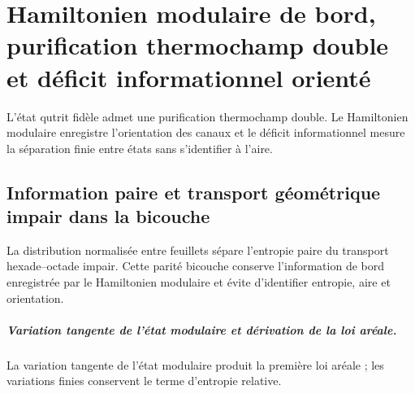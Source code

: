 \chapter{Hamiltonien modulaire de bord, purification thermochamp double et déficit informationnel orienté}
\label{chap:parte-iv-60}

L’état qutrit fidèle admet une purification thermochamp double. Le Hamiltonien modulaire enregistre l’orientation des canaux et le déficit informationnel mesure la séparation finie entre états sans s’identifier à l’aire.



\section{Information paire et transport géométrique impair dans la bicouche}

La distribution normalisée entre feuillets sépare l’entropie paire du transport hexade--octade impair. Cette parité bicouche conserve l’information de bord enregistrée par le Hamiltonien modulaire et évite d’identifier entropie, aire et orientation.

\begingroup
\let\chapter\section
\let\section\subsection
\let\subsection\subsubsection
\let\subsubsection\paragraph
\let\clearpage\relax
\let\cleardoublepage\relax

\endgroup

\paragraph{Variation tangente de l’état modulaire et dérivation de la loi aréale.} La variation tangente de l’état modulaire produit la première loi aréale ; les variations finies conservent le terme d’entropie relative.
